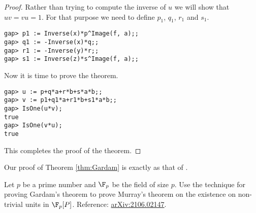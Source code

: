 \begin{proof}
    Rather than trying 
    to compute the inverse of $u$ we will show that 
    $uv=vu=1$. For that purpose we need to define
    $p_1$, $q_1$, $r_1$ and $s_1$.
\begin{lstlisting}
gap> p1 := Inverse(x)*p^Image(f, a);;
gap> q1 := -Inverse(x)*q;;
gap> r1 := -Inverse(y)*r;;
gap> s1 := Inverse(z)*s^Image(f, a);;
\end{lstlisting}
Now it is time to prove the theorem. 
\begin{lstlisting}
gap> u := p+q*a+r*b+s*a*b;;
gap> v := p1+q1*a+r1*b+s1*a*b;;
gap> IsOne(u*v);
true
gap> IsOne(v*u);
true
\end{lstlisting}
This completes the proof of the theorem. 
\end{proof}

Our proof of Theorem \ref{thm:Gardam} is exactly 
as that of \cite{MR4334981}. 

\begin{exercise}
     Let $p$ be a prime number and $\F_p$ be the field of size $p$. 
     Use the technique 
     for proving Gardam's theorem to prove Murray's theorem
     on the existence 
     on non-trivial units in $\F_p[P]$. 
     Reference: \href{https://arxiv.org/abs/2106.02147}{arXiv:2106.02147}. 
\end{exercise}




